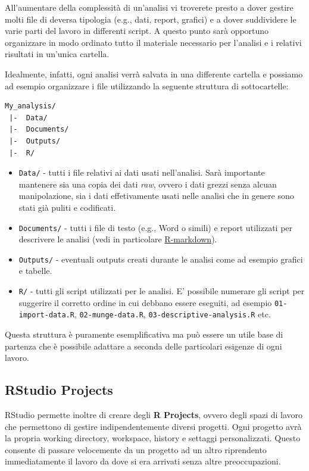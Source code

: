 \documentclass[
]{book}
\providecommand{\tightlist}{%
  \setlength{\itemsep}{0pt}\setlength{\parskip}{0pt}}
\begin{document}
All'aumentare della complessità di un'analisi vi troverete presto a dover gestire molti file di deversa tipologia (e.g., dati, report, grafici) e a dover suddividere le varie parti del lavoro in differenti script. A questo punto sarà opportuno organizzare in modo ordinato tutto il materiale necessario per l'analisi e i relativi risultati in un'unica cartella.

Idealmente, infatti, ogni analisi verrà salvata in una differente cartella e possiamo ad esempio organizzare i file utilizzando la seguente struttura di sottocartelle:

\begin{verbatim}
My_analysis/
 |-  Data/
 |-  Documents/
 |-  Outputs/
 |-  R/
\end{verbatim}

\begin{itemize}
\tightlist
\item
  \texttt{Data/} - tutti i file relativi ai dati usati nell'analisi. Sarà importante mantenere sia una copia dei dati \emph{raw}, ovvero i dati grezzi senza alcuan manipolazione, sia i dati effetivamente usati nelle analisi che in genere sono stati già puliti e codificati.
\item
  \texttt{Documents/} - tutti i file di testo (e.g., Word o simili) e report utilizzati per descrivere le analisi (vedi in particolare \href{https://rmarkdown.rstudio.com/}{R-markdown}).
\item
  \texttt{Outputs/} - eventuali outputs creati durante le analisi come ad esempio grafici e tabelle.
\item
  \texttt{R/} - tutti gli script utilizzati per le analisi. E' possibile numerare gli script per suggerire il corretto ordine in cui debbano essere eseguiti, ad esempio \texttt{01-import-data.R}, \texttt{02-munge-data.R}, \texttt{03-descriptive-analysis.R} etc.
\end{itemize}

Questa struttura è puramente esemplificativa ma può essere un utile base di partenza che è possibile adattare a seconda delle particolari esigenze di ogni lavoro.

\hypertarget{rstudio-projects}{%
\subsection{RStudio Projects}\label{rstudio-projects}}

RStudio permette inoltre di creare degli \textbf{R Projects}, ovvero degli spazi di lavoro che permettono di gestire indipendentemente diversi progetti. Ogni progetto avrà la propria working directory, workspace, history e settaggi personalizzati. Questo consente di passare velocemente da un progetto ad un altro riprendento immediatamente il lavoro da dove si era arrivati senza altre preoccupazioni.
\end{document}
